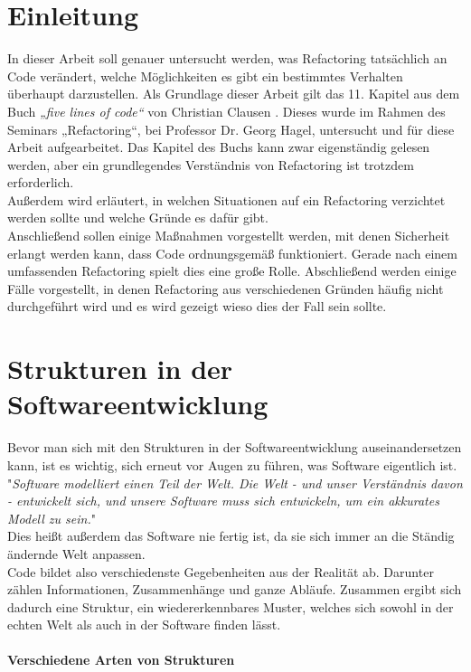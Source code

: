 \chapter{Einleitung}
In dieser Arbeit soll genauer untersucht werden, was Refactoring tatsächlich an Code verändert, welche Möglichkeiten es gibt ein bestimmtes Verhalten überhaupt darzustellen.
Als Grundlage dieser Arbeit gilt das 11. Kapitel aus dem Buch \textit{„five lines of code“} von Christian Clausen \cite{fiveLines.2023}.
Dieses wurde im Rahmen des Seminars „Refactoring“, bei Professor Dr. Georg Hagel, untersucht und für diese Arbeit aufgearbeitet. 
Das Kapitel des Buchs kann zwar eigenständig gelesen werden, aber ein grundlegendes Verständnis von Refactoring ist trotzdem erforderlich.\\
Außerdem wird erläutert, in welchen Situationen auf ein Refactoring verzichtet werden sollte und welche Gründe es dafür gibt.\\
Anschließend sollen einige Maßnahmen vorgestellt werden, mit denen Sicherheit erlangt werden kann, dass Code ordnungsgemäß funktioniert.
Gerade nach einem umfassenden Refactoring spielt dies eine große Rolle. 
Abschließend werden einige Fälle vorgestellt, in denen Refactoring aus verschiedenen Gründen häufig nicht durchgeführt wird und es wird gezeigt wieso dies der Fall sein sollte.
\chapter{Strukturen in der Softwareentwicklung}
Bevor man sich mit den Strukturen in der Softwareentwicklung auseinandersetzen kann, ist es wichtig, sich erneut vor Augen zu führen, was Software eigentlich ist.\\
"\emph{Software modelliert einen Teil der Welt. Die Welt - und unser Verständnis davon - entwickelt sich, und unsere Software muss sich entwickeln, um ein akkurates Modell zu sein.}" \citep[S. 311]{fiveLines.2023}\\
Dies heißt außerdem das Software nie fertig ist, da sie sich immer an die Ständig ändernde Welt anpassen.\\
Code bildet also verschiedenste Gegebenheiten aus der Realität ab. Darunter zählen Informationen, Zusammenhänge und ganze Abläufe.
Zusammen ergibt sich dadurch eine Struktur, ein wiedererkennbares Muster, welches sich sowohl in der echten Welt als auch in der Software finden lässt. \citep[S. 311]{fiveLines.2023}
\subsubsection{Verschiedene Arten von Strukturen}


